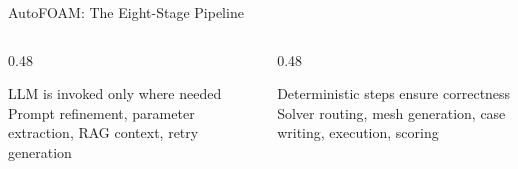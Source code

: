 \documentclass[aspectratio=169,10pt]{beamer}
\begin{document}
\begin{frame}{AutoFOAM: The Eight-Stage Pipeline}
  \begin{columns}
    \begin{column}{0.48\textwidth}
      \begin{block}{LLM is invoked only where needed}
        \small Prompt refinement, parameter extraction, RAG context, retry generation
      \end{block}
    \end{column}
    \begin{column}{0.48\textwidth}
      \begin{block}{Deterministic steps ensure correctness}
        \small Solver routing, mesh generation, case writing, execution, scoring
      \end{block}
    \end{column}
  \end{columns}
\end{frame}
\end{document}
